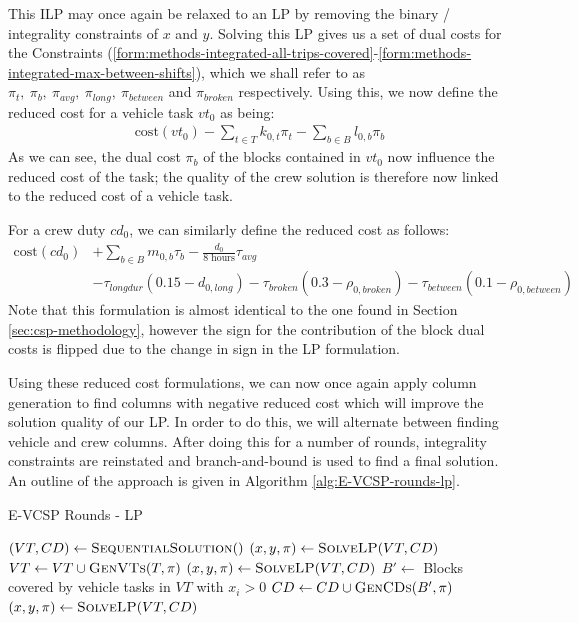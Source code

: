 \documentclass[]{article}
\begin{document}
This ILP may once again be relaxed to an LP by removing the binary / integrality constraints of $x$ and $y$. Solving this LP gives us a set of dual costs for the Constraints (\ref{form:methods-integrated-all-trips-covered}-\ref{form:methods-integrated-max-between-shifts}), which we shall refer to as $\pi_t,\:\pi_b,\:\pi_{avg},\:\pi_{long},\:\pi_{between}$ and $\pi_{broken}$ respectively. Using this, we now define the reduced cost for a vehicle task $vt_0$ as being:
\begin{align}
\text{cost}(vt_0) - \sum_{t \in T} k_{0,t}\pi_t - \sum_{b \in B} l_{0,b}\pi_b \label{form:evcsp-rc-vt}
\end{align}
As we can see, the dual cost $\pi_b$ of the blocks contained in $vt_0$ now influence the reduced cost of the task; the quality of the crew solution is therefore now linked to the reduced cost of a vehicle task.

For a crew duty $cd_0$, we can similarly define the reduced cost as follows: 
\begin{align}
\text{cost}(cd_0) 
&+ \sum_{b \in B} m_{0,b} \tau_{b} 
- \frac{d_0}{\text{8 hours}} \tau_{\textit{avg}} \nonumber \\
&- \tau_{\textit{longdur}} (0.15 - d_{0,\textit{long}}) 
- \tau_{\textit{broken}} (0.3 - \rho_{0,\textit{broken}}) 
- \tau_{\textit{between}} (0.1 - \rho_{0,\textit{between}})
\end{align}
Note that this formulation is almost identical to the one found in Section \ref{sec:csp-methodology}, however the sign for the contribution of the block dual costs is flipped due to the change in sign in the LP formulation. 

Using these reduced cost formulations, we can now once again apply column generation to find columns with negative reduced cost which will improve the solution quality of our LP. In order to do this, we will alternate between finding vehicle and crew columns. After doing this for a number of rounds, integrality constraints are reinstated and branch-and-bound is used to find a final solution. An outline of the approach is given in Algorithm \ref{alg:E-VCSP-rounds-lp}. 

\begin{algorithm}[h]
\caption{E-VCSP Rounds - LP}\label{alg:E-VCSP-rounds-lp}
\begin{algorithmic}[1]
\State $(VT, CD) \gets \Call{SequentialSolution}$
\State $(x, y, \pi) \gets \Call{SolveLP}{VT, CD}$
    \State $VT \gets VT \cup \Call{GenVTs}{T, \pi}$
    \State $(x, y, \pi) \gets \Call{SolveLP}{VT, CD}$
  \EndFor
    \State $B' \gets$ Blocks covered by vehicle tasks in $VT$ with $x_i > 0$ \label{line:block-coverage}
    \State $CD \gets CD \cup \Call{GenCDs}{B', \pi}$
    \State $(x, y, \pi) \gets \Call{SolveLP}{VT, CD}$
  \EndFor
\EndFor
{}
\end{algorithmic}
\end{algorithm}
\end{document}
